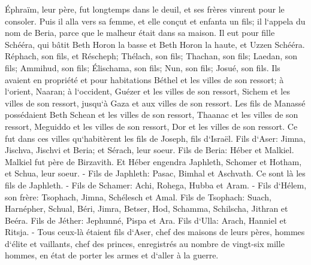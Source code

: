 \verse Éphraïm, leur père, fut longtemps dans le deuil, et ses frères vinrent pour le consoler. 
\verse Puis il alla vers sa femme, et elle conçut et enfanta un fils; il l`appela du nom de Beria, parce que le malheur était dans sa maison. 
\verse Il eut pour fille Schééra, qui bâtit Beth Horon la basse et Beth Horon la haute, et Uzzen Schééra. 
\verse Réphach, son fils, et Réscheph; Thélach, son fils; Thachan, son fils; 
\verse Laedan, son fils; Ammihud, son fils; Élischama, son fils; 
\verse Nun, son fils; Josué, son fils. 
\verse Ils avaient en propriété et pour habitations Béthel et les villes de son ressort; à l`orient, Naaran; à l`occident, Guézer et les villes de son ressort, Sichem et les villes de son ressort, jusqu`à Gaza et aux villes de son ressort. 
\verse Les fils de Manassé possédaient Beth Schean et les villes de son ressort, Thaanac et les villes de son ressort, Meguiddo et les villes de son ressort, Dor et les villes de son ressort. Ce fut dans ces villes qu`habitèrent les fils de Joseph, fils d`Israël. 
\verse Fils d`Aser: Jimna, Jischva, Jischvi et Beria; et Sérach, leur soeur. 
\verse Fils de Beria: Héber et Malkiel. Malkiel fut père de Birzavith. 
\verse Et Héber engendra Japhleth, Schomer et Hotham, et Schua, leur soeur. - 
\verse Fils de Japhleth: Pasac, Bimhal et Aschvath. Ce sont là les fils de Japhleth. - 
\verse Fils de Schamer: Achi, Rohega, Hubba et Aram. - 
\verse Fils d`Hélem, son frère: Tsophach, Jimna, Schélesch et Amal. 
\verse Fils de Tsophach: Suach, Harnépher, Schual, Béri, Jimra, 
\verse Betser, Hod, Schamma, Schilscha, Jithran et Beéra. 
\verse Fils de Jéther: Jephunné, Pispa et Ara. 
\verse Fils d`Ulla: Arach, Hanniel et Ritsja. - 
\verse Tous ceux-là étaient fils d`Aser, chef des maisons de leurs pères, hommes d`élite et vaillants, chef des princes, enregistrés au nombre de vingt-six mille hommes, en état de porter les armes et d`aller à la guerre. 

\chapter{}

